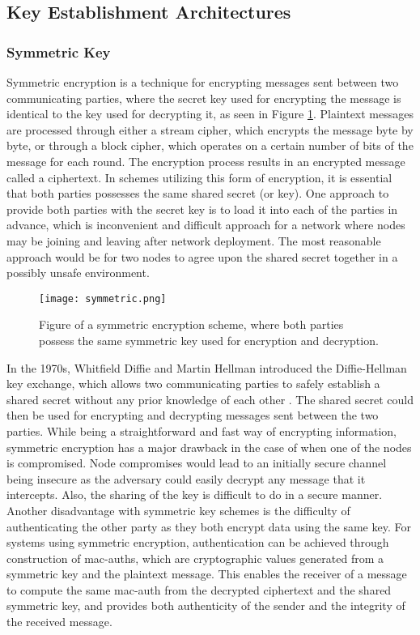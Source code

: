 \subsection{Key Establishment Architectures}

\subsubsection{Symmetric Key}

Symmetric encryption is a technique for encrypting messages sent between two communicating parties, where the secret key used for encrypting the message is identical to the key used for decrypting it, as seen in Figure \ref{fig:symmetric}. Plaintext messages are processed through either a stream cipher, which encrypts the message byte by byte, or through a block cipher, which operates on a certain number of bits of the message for each round. The encryption process results in an encrypted message called a ciphertext. In schemes utilizing this form of encryption, it is essential that both parties possesses the same shared secret (or key). One approach to provide both parties with the secret key is to load it into each of the parties in advance, which is inconvenient and difficult approach for a network where nodes may be joining and leaving after network deployment. The most reasonable approach would be for two nodes to agree upon the shared secret together in a possibly unsafe environment.

\begin{figure}[h]
	\centering
	\texttt{[image: symmetric.png]}
	\caption{Figure of a symmetric encryption scheme, where both parties possess the same symmetric key used for encryption and decryption.}
	\label{fig:symmetric}
\end{figure}

In the 1970s, Whitfield Diffie and Martin Hellman introduced the Diffie-Hellman key exchange, which allows two communicating parties to safely establish a shared secret without any prior knowledge of each other \cite{diffie1976new}. The shared secret could then be used for encrypting and decrypting messages sent between the two parties.  While being a straightforward and fast way of encrypting information, symmetric encryption has a major drawback in the case of when one of the nodes is compromised. Node compromises would lead to an initially secure channel being insecure as the adversary could easily decrypt any message that it intercepts. Also, the sharing of the key is difficult to do in a secure manner. Another disadvantage with symmetric key schemes is the difficulty of authenticating the other party as they both encrypt data using the same key. For systems using symmetric encryption, authentication can be achieved through construction of \gls{mac-auth}s, which are cryptographic values generated from a symmetric key and the plaintext message. This enables the receiver of a message to compute the same \gls{mac-auth} from the decrypted ciphertext and the shared symmetric key, and provides both authenticity of the sender and the integrity of the received message.


